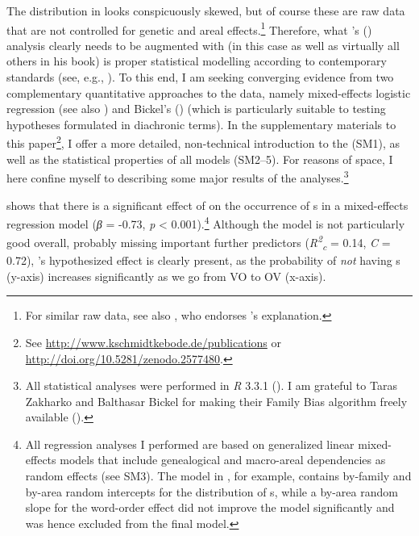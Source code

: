 \documentclass[output=paper]{langsci/langscibook}
\begin{document}
The distribution in  looks conspicuously skewed, but of course these are raw data that are not controlled for genetic and areal effects.\footnote{For similar raw data, see also \citet{Dryer2009_Corr}, who endorses ’s  explanation.} Therefore, what 's  (\citeyear{Hawkins2014_VarEff}) analysis clearly needs to be augmented with (in this case as well as virtually all others in his book) is proper statistical modelling according to contemporary standards (see, e.g., \citealt{Bickel2011_Modelling}). To this end, I am seeking converging evidence from two complementary quantitative approaches to the data, namely mixed-effects logistic regression (see also \citealt{Cysouw2010_NP,JaegerEtAl2011}) and Bickel’s (\citeyear{Bickel2011_Modelling,Bickel2013_Fam})  (which is particularly suitable to testing hypotheses formulated in diachronic terms). In the supplementary materials to this paper\footnote{See \url{http://www.kschmidtkebode.de/publications} or \url{http://doi.org/10.5281/zenodo.2577480}.}, I offer a more detailed, non-technical introduction to the  (SM1), as well as the statistical properties of all models (SM2–5). For reasons of space, I here confine myself to describing some major results of the analyses.\footnote{All statistical analyses were performed in \textit{R} 3.3.1 (\citealt{RTeam2016_R}). I am grateful to Taras Zakharko and Balthasar Bickel for making their Family Bias algorithm freely available (\citealt{ZakharkoBickel2011}).}

 shows that there is a significant effect of  on the occurrence of s in a mixed-effects regression model (\textit{β} = -0.73, \textit{p} < 0.001).\footnote{All regression analyses I performed are based on generalized linear mixed-effects models that include genealogical and macro-areal dependencies as random effects (see SM3). The model in , for example, contains by-family and by-area random intercepts for the distribution of s, while a by-area random slope for the word-order effect did not improve the model significantly and was hence excluded from the final model.} Although the model is not particularly good overall, probably missing important further predictors (\textit{R\textsuperscript{2}}\textit{\textsubscript{c}} = 0.14, \textit{C} = 0.72), ’s hypothesized effect is clearly present, as the probability of \textit{not} having s (y-axis) increases significantly as we go from VO to OV (x-axis).
\end{document}

